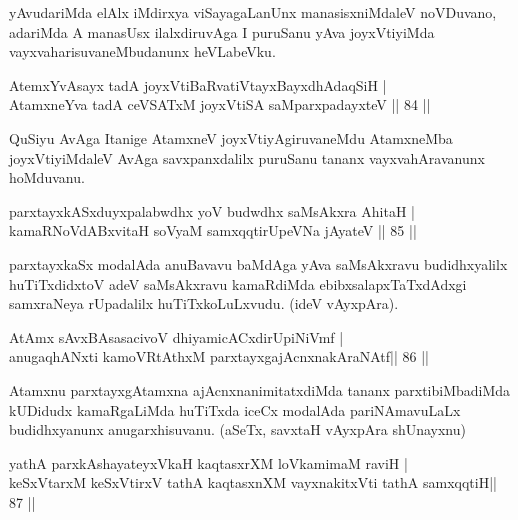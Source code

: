 \begin{artha}
yAvudariMda elAlx iMdirxya viSayagaLanUnx manasisxniMdaleV noVDuvano, adariMda A manasUsx ilalxdiruvAga I puruSanu yAva joyxVtiyiMda vayxvaharisuvaneMbudanunx heVLabeVku.
\end{artha}

\begin{shl}
AtemxYvAsayx tadA joyxVtiBaRvatiVtayxBayxdhAdaqSiH | \\
AtamxneYva tadA ceVSATxM joyxVtiSA saMparxpadayxteV \hfill||  84 ||  
\end{shl}

\begin{artha}
QuSiyu AvAga Itanige AtamxneV joyxVtiyAgiruvaneMdu AtamxneMba joyxVtiyiMdaleV AvAga savxpanxdalilx puruSanu tananx vayxvahAravanunx hoMduvanu.
\end{artha}


\begin{shl}
parxtayxkASxduyxpalabwdhx yoV budwdhx saMsAkxra AhitaH | \\
kamaRNoVdABxvitaH soV\s yaM samxqqtirUpeVNa jAyateV \hfill||  85 ||  
\end{shl}

\begin{artha}
parxtayxkaSx modalAda anuBavavu baMdAga yAva saMsAkxravu budidhxyalilx huTiTxdidxtoV adeV saMsAkxravu kamaRdiMda ebibxsalapxTaTxdAdxgi samxraNeya rUpadalilx huTiTxkoLuLxvudu. (ideV vAyxpAra).
\end{artha}


\begin{shl}
AtAmx sAvxBAsasacivoV dhiyamicACxdirUpiNiVmf | \\
anugaqhANxti kamoVRtAthxM parxtayxgajAcnxnakAraNAtf\hfill ||  86 ||  
\end{shl}

\begin{artha}
Atamxnu parxtayxgAtamxna ajAcnxnanimitatxdiMda tananx parxtibiMbadiMda kUDidudx kamaRgaLiMda huTiTxda iceCx modalAda pariNAmavuLaLx budidhxyanunx anugarxhisuvanu. (aSeTx, savxtaH vAyxpAra shUnayxnu)
\end{artha}


\begin{shl}
yathA parxkAshayateyxVkaH kaqtasxrXM loVkamimaM raviH | \\
keSxVtarxM keSxVtirxV tathA kaqtasxnXM vayxnakitxVti tathA samxqqtiH\hfill ||  87 ||  
\end{shl}

